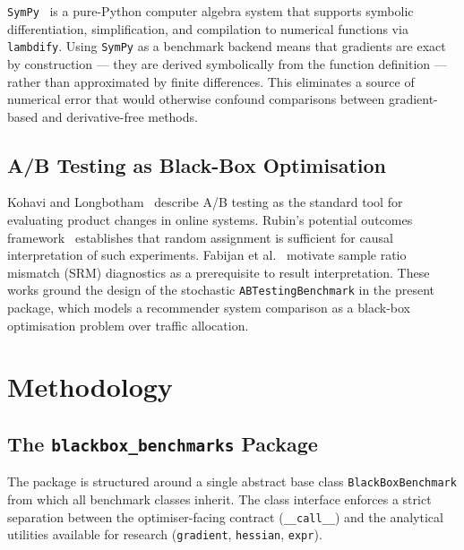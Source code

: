 \texttt{SymPy}~\cite{sympy2017} is a pure-Python computer algebra system
that supports symbolic differentiation, simplification, and compilation
to numerical functions via \texttt{lambdify}. Using \texttt{SymPy} as a
benchmark backend means that gradients are exact by construction — they
are derived symbolically from the function definition — rather than
approximated by finite differences. This eliminates a source of numerical
error that would otherwise confound comparisons between gradient-based and
derivative-free methods.

\subsection{A/B Testing as Black-Box Optimisation}

Kohavi and Longbotham~\cite{kohavi2016online} describe A/B testing as the
standard tool for evaluating product changes in online systems. Rubin's
potential outcomes framework~\cite{rubin1999teaching} establishes that
random assignment is sufficient for causal interpretation of such
experiments. Fabijan et al.~\cite{fabijan2019srm} motivate sample ratio
mismatch (SRM) diagnostics as a prerequisite to result interpretation.
These works ground the design of the stochastic \texttt{ABTestingBenchmark}
in the present package, which models a recommender system comparison as a
black-box optimisation problem over traffic allocation.

\clearpage

\section{Methodology}

\subsection{The \texttt{blackbox\_benchmarks} Package}

The package is structured around a single abstract base class
\texttt{BlackBoxBenchmark} from which all benchmark classes inherit.
The class interface enforces a strict separation between the
optimiser-facing contract (\texttt{\_\_call\_\_}) and the analytical
utilities available for research (\texttt{gradient}, \texttt{hessian},
\texttt{expr}).


